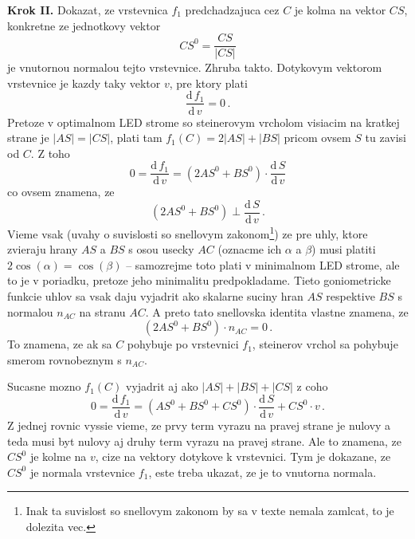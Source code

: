 \documentclass[12pt]{book}
\newcommand{\dd}{\mathrm{d}\,}
\begin{document}
{\bf Krok II.}
Dokazat, ze vrstevnica $f_{1}$ predchadzajuca cez $C$ je kolma na vektor
    $CS$, konkretne ze jednotkovy vektor
    \begin{equation*}
        CS^{0}
        =
        \frac{CS}{|CS|}
    \end{equation*}
    je vnutornou normalou tejto vrstevnice.
Zhruba takto.
Dotykovym vektorom vrstevnice je kazdy taky vektor $v$, pre ktory plati
    \begin{equation*}
        \frac{\dd f_{1}}{\dd v}
        =
        0\,.
    \end{equation*}
Pretoze v optimalnom LED strome so steinerovym vrcholom visiacim na kratkej
    strane je $|AS|=|CS|$, plati tam $f_{1}(C) = 2|AS| + |BS|$ pricom ovsem
    $S$ tu zavisi od $C$.
Z toho
    \begin{equation*}
        0
        =
        \frac{\dd f_{1}}{\dd v}
        =
        \left(2 AS^{0} + BS^{0}\right)\cdot\frac{\dd S}{\dd v}
    \end{equation*}
    co ovsem znamena, ze 
    \begin{equation*}
        \left(2 AS^{0} + BS^{0}\right)
        \perp
        \frac{\dd S}{\dd v}\,.
    \end{equation*}
Vieme vsak (uvahy o suvislosti so snellovym zakonom\footnote{Inak ta suvislost
    so snellovym zakonom by sa v texte nemala zamlcat, to je dolezita vec.})
    ze pre uhly, ktore zvieraju hrany $AS$ a $BS$ s osou usecky $AC$ (oznacme
    ich $\alpha$ a $\beta$) musi platiti $2\cos(\alpha) = \cos(\beta)$ --
    samozrejme toto plati v minimalnom LED strome, ale to je v poriadku,
    pretoze jeho minimalitu predpokladame.
Tieto goniometricke funkcie uhlov sa vsak daju vyjadrit ako skalarne suciny
    hran $AS$ respektive $BS$ s normalou $n_{AC}$ na stranu $AC$.
A preto tato snellovska identita vlastne znamena, ze
    \begin{equation*}
        \left(2 AS^{0} + BS^{0}\right)
        \cdot
        n_{AC}
        =
        0\,.
    \end{equation*}
To znamena, ze ak sa $C$ pohybuje po vrstevnici $f_{1}$, steinerov vrchol sa
    pohybuje smerom rovnobeznym s $n_{AC}$.

Sucasne mozno $f_{1}(C)$ vyjadrit aj ako $|AS|+|BS|+|CS|$ z coho
    \begin{equation*}
        0
        =
        \frac{\dd f_{1}}{\dd v}
        =
        \left(AS^{0} + BS^{0} + CS^{0}\right)\cdot \frac{\dd S}{\dd v} + CS^{0}\cdot v\,.
    \end{equation*}
Z jednej rovnic vyssie vieme, ze prvy term vyrazu na pravej strane je nulovy
    a teda musi byt nulovy aj druhy term vyrazu na pravej strane.
Ale to znamena, ze $CS^{0}$ je kolme na $v$, cize na vektory dotykove k
    vrstevnici.
Tym je dokazane, ze $CS^{0}$ je normala vrstevnice $f_{1}$, este treba ukazat,
    ze je to vnutorna normala.
\end{document}
